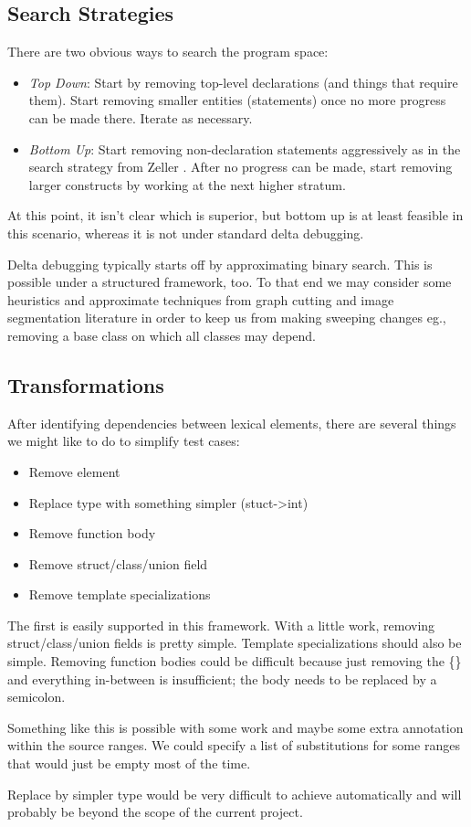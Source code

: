 \documentclass[11pt]{article}
\begin{document}
\begin{itemize}
\subsection{Search Strategies}
There are two obvious ways to search the program space:
\begin{itemize}
\item \emph{Top Down}: Start by removing top-level declarations (and things that
  require them). Start removing smaller entities (statements) once no more
  progress can be made there. Iterate as necessary.
\item \emph{Bottom Up}: Start removing non-declaration statements aggressively
  as in the search strategy from Zeller \cite{dd}. After no progress can be made, start
  removing larger constructs by working at the next higher stratum.
\end{itemize}
At this point, it isn't clear which is superior, but bottom up is at least
feasible in this scenario, whereas it is not under standard delta debugging.

Delta debugging typically starts off by approximating binary search. This is
possible under a structured framework, too. To that end we may consider some
heuristics and approximate techniques from graph cutting and image segmentation
literature \cite{nc} in order to keep us from making sweeping changes eg.,
removing a base class on which all classes may depend.

\subsection{Transformations}
After identifying dependencies between lexical elements, there are several
things we might like to do to simplify test cases:
\begin{itemize}
\item Remove element
\item Replace type with something simpler (stuct->int)
\item Remove function body
\item Remove struct/class/union field
\item Remove template specializations
\end{itemize}
The first is easily supported in this framework. With a little work, removing
struct/class/union fields is pretty simple. Template specializations should also
be simple. Removing function bodies could be difficult because just removing the
\{\} and everything in-between is insufficient; the body needs to be replaced by a
semicolon.

Something like this is possible with some work and maybe some extra annotation
within the source ranges. We could specify a list of substitutions for some
ranges that would just be empty most of the time.

Replace by simpler type would be very difficult to achieve automatically and
will probably be beyond the scope of the current project.

\end{itemize}
\end{document}
